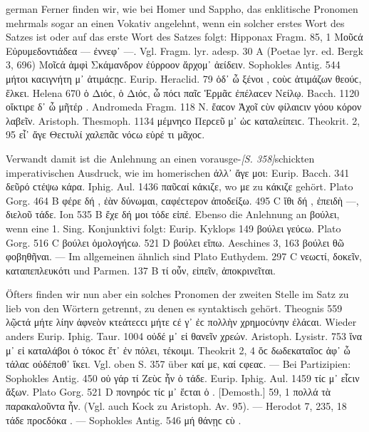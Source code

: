 \begin{otherlanguage*}{german}
Ferner finden wir, wie bei Homer und Sappho, das enklitische Pronomen mehrmals sogar an einen Vokativ angelehnt, wenn ein solcher erstes Wort des Satzes ist oder auf das erste Wort des Satzes folgt: Hipponax Fragm. 85, 1 Μοῦϲά  Εὐρυμεδοντιάδεα — ἐννεφ᾽ —. Vgl. Fragm. lyr. adesp. 30 A (Poetae lyr. ed. Bergk 3, 696) Μοῖϲά  ἀμφὶ Σκάμανδρον ἐύρροον ἄρχομ᾽ ἀείδειν. Sophokles Antig. 544 μήτοι καϲιγνήτη μ᾽ ἀτιμάϲῃϲ. Eurip. Heraclid. 79 ὁδ᾽ ὦ ξένοι , ϲοὺϲ ἀτιμάζων θεούϲ, ἕλκει. Helena 670 ὁ Διόϲ, ὁ Διόϲ, ὦ πόϲι  παῖϲ Ἑρμᾶϲ ἐπέλαϲεν Νείλῳ. Bacch. 1120 οἴκτιρε δ᾽ ὦ μῆτέρ . Andromeda Fragm. 118 Ν. ἔαϲον Ἀχοῖ  ϲὺν φίλαιϲιν γόου κόρον λαβεῖν. Aristoph. Thesmoph. 1134 μέμνηϲο Περϲεῦ μ᾽ ὡϲ καταλείπειϲ. Theokrit. 2, 95 εἶ᾽ ἄγε Θεϲτυλί  χαλεπᾶϲ νόϲω εὑρέ τι μᾶχοϲ.

Verwandt damit ist die Anlehnung an einen vorausge-\hypertarget{p358}{\emph{[S. 358]}}\label{p358}schickten imperativischen Ausdruck, wie im homerischen ἀλλ᾽ ἄγε μοι: Eurip. Bacch. 341 δεῦρό  ϲτέψω κάρα. Iphig. Aul. 1436 παῦϲαί  κάκιζε, wo με zu κάκιζε gehört. Plato Gorg. 464 Β φέρε δή , ἐὰν δύνωμαι, ϲαφέϲτερον ἀποδείξω. 495 C ἴθι δή , ἐπειδὴ —, διελοῦ τάδε. Ion 535 Β ἔχε δή μοι τόδε εἰπέ. Ebenso die Anlehnung an βούλει, wenn eine 1. Sing. Konjunktivi folgt: Eurip. Kyklops 149 βούλει  γεύϲω. Plato Gorg. 516 C βούλει  ὁμολογήϲω. 521 D βούλει  εἴπω. Aeschines 3, 163 βούλει  θῶ φοβηθῆναι. — Im allgemeinen ähnlich sind Plato Euthydem. 297 C νεωϲτί,  δοκεῖν, καταπεπλευκότι und Parmen. 137 Β τί οὖν, εἰπεῖν,  ἀποκρινεῖται.

Öfters finden wir nun aber ein solches Pronomen der zweiten Stelle im Satz zu lieb von den Wörtern getrennt, zu denen es syntaktisch gehört. Theognis 559 λῷϲτά  μήτε λίην ἀφνεὸν κτεάτεϲϲι μήτε ϲέ γ᾽ ἐϲ πολλὴν χρημοϲύνην ἐλάϲαι. Wieder anders Eurip. Iphig. Taur. 1004 οὐδέ μ᾽ εἰ θανεῖν χρεών. Aristoph. Lysistr. 753 ἵνα μ᾽ εἰ καταλάβοι ὁ τόκοϲ ἔτ᾽ ἐν πόλει, τέκοιμι. Theokrit 2, 4 ὅϲ  δωδεκαταῖοϲ ἀφ᾽ ὧ τάλαϲ οὐδέποθ᾽ ἵκει. Vgl. oben S. 357 über καί με, καί ϲφεαϲ. — Bei Partizipien: Sophokles Antig. 450 οὐ γάρ τί  Ζεὺϲ ἦν ὁ  τάδε. Eurip. Iphig. Aul. 1459 τίϲ μ᾽ εἶϲιν ἄξων. Plato Gorg. 521 D πονηρόϲ τίϲ μ᾽ ἔϲται ὁ . [Demosth.] 59, 1 πολλά  τὰ παρακαλοῦντα ἦν. (Vgl. auch Kock zu Aristoph. Av. 95). — Herodot 7, 235, 18 τάδε  προϲδόκα . — Sophokles Antig. 546 μή  θάνῃϲ ϲὺ .


\end{otherlanguage*}
